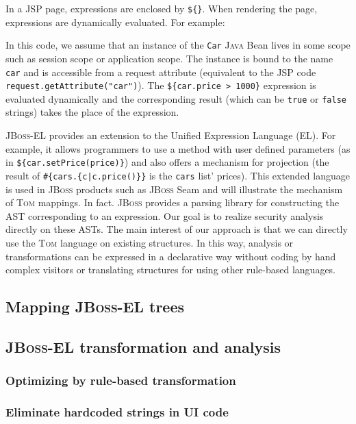 \documentclass[runningheads]{llncs}
\newcommand{\jbossel}{\textsc{JBoss-EL}}
\newcommand{\jboss}{\textsc{JBoss}}
\newcommand{\jsp}{\textsc{JSP}}
\newcommand{\tom}{\textsc{Tom}}
\newcommand{\java}{\textsc{Java}}
\begin{document}
In a {\jsp} page, expressions are enclosed by \texttt{\$\{\}}. When rendering
the page, expressions are dynamically evaluated. For example:


In this code, we assume that an instance of the \verb+Car+ {\java} Bean lives
in some scope such as session scope or application scope.  The instance is
bound to the name \texttt{car} and is accessible from a request attribute
(equivalent to the {\jsp} code \verb+request.getAttribute("car")+). The
\verb+${car.price > 1000}+ expression is evaluated dynamically and the
corresponding result (which can be \verb+true+ or \verb+false+ strings) takes
the place of the expression.

{\jbossel} provides an extension to the Unified Expression Language (EL). For
example, it allows programmers to use a method with user defined parameters (as
    in \verb+${car.setPrice(price)}+) and also offers a mechanism for
projection (the result of \verb+#{cars.{c|c.price()}}+ is the \verb+cars+ list'
    prices).  This extended language is used in {\jboss} products such as
{\jboss} Seam and will illustrate the mechanism of {\tom} mappings. In fact.
{\jboss} provides a parsing library for constructing the AST corresponding to
an expression. Our goal is to realize security analysis directly on these ASTs.
The main interest of our approach is that we can directly use the {\tom}
language on existing structures. In this way, analysis or transformations can
be expressed in a declarative way without coding by hand complex visitors or
translating structures for using other rule-based languages.

\subsection{Mapping {\jbossel} trees}


\subsection{{\jbossel} transformation and analysis}

\subsubsection{Optimizing by rule-based transformation}

\subsubsection{Eliminate hardcoded strings in UI code}
\end{document}
